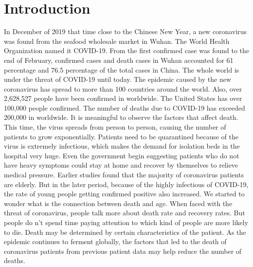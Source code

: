 \documentclass[12pt,english]{article}
\begin{document}
\section{Introduction}
In December of 2019 that time close to the Chinese New Year, a new coronavirus was found from the seafood wholesale market in Wuhan. The World Health Organization named it COVID-19. From the first confirmed case was found to the end of February, confirmed cases and death cases in Wuhan accounted for 61 percentage and 76.5 percentage of the total cases in China.
\cite{jia2020prediction}
\newline
The whole world is under the threat of COVID-19 until today. The epidemic caused by the new coronavirus has spread to more than 100 countries around the world. Also, over 2,628,527 people have been confirmed in worldwide. The United States has over 100,000 people confirmed. The number of deaths due to COVID-19 has exceeded 200,000 in worldwide. It is meaningful to observe the factors that affect death.
\newline
This time, the virus spreads from person to person, causing the number of patients to grow exponentially. 
\cite{ivanov2020predicting}
Patients need to be quarantined because of the virus is extremely infectious, which makes the demand for isolation beds in the hospital very huge.
Even the government begin suggesting patients who do not have heavy symptoms could stay at home and recover by themselves to relieve medical pressure.
\newline
Earlier studies found that the majority of coronavirus patients are elderly. But in the later period, because of the highly infectious of COVID-19, the rate of young people getting confirmed positive also increased. We started to wonder what is the connection between death and age.
\cite{baud2020real}
When faced with the threat of coronavirus, people talk more about death rate and recovery rates. But people do n’t spend time paying attention to which kind of people are more likely to die. 
Death may be determined by certain characteristics of the patient. As the epidemic continues to ferment globally, the factors that led to the death of coronavirus patients from previous patient data may help reduce the number of deaths.
\cite{batista2020estimation}
\end{document}
